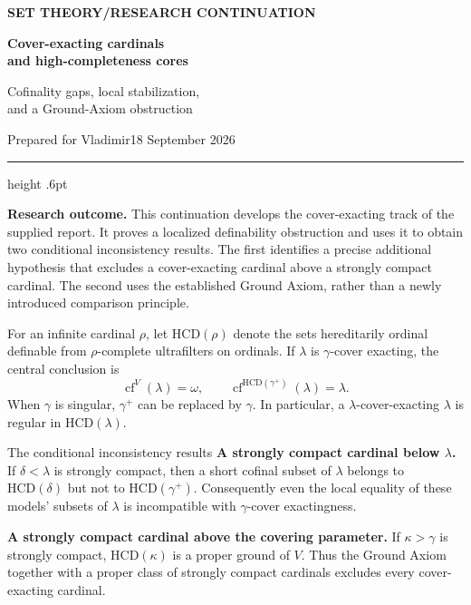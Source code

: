 \documentclass[11pt,letterpaper]{article}
\theoremstyle{definition}
\newcommand{\cf}{\operatorname{cf}}
\newcommand{\HCD}{\mathrm{HCD}}
\begin{document}
\thispagestyle{empty}
{\sffamily\bfseries\small\color{Olive}SET THEORY\quad /\quad RESEARCH CONTINUATION}

\vspace{13pt}
{\fontsize{28}{31}\selectfont\bfseries\color{Forest}Cover-exacting cardinals\\ and high-completeness cores\par}
\vspace{10pt}
{\fontsize{14}{18}\selectfont Cofinality gaps, local stabilization,\\ and a Ground-Axiom obstruction\par}
\vspace{14pt}
{\color{Muted}Prepared for Vladimir\hfill 18 September 2026\par}
\vspace{3pt}
{\color{Sage}\hrule height .6pt}
\vspace{12pt}

\textbf{Research outcome.} This continuation develops the cover-exacting track of the supplied report. It proves a localized definability obstruction and uses it to obtain two conditional inconsistency results. The first identifies a precise additional hypothesis that excludes a cover-exacting cardinal above a strongly compact cardinal. The second uses the established Ground Axiom, rather than a newly introduced comparison principle.

For an infinite cardinal $\rho$, let $\HCD(\rho)$ denote the sets hereditarily ordinal definable from $\rho$-complete ultrafilters on ordinals. If $\lambda$ is $\gamma$-cover exacting, the central conclusion is
\[
   \cf^V(\lambda)=\omega,
   \qquad
   \cf^{\HCD(\gamma^+)}(\lambda)=\lambda.
\]
When $\gamma$ is singular, $\gamma^+$ can be replaced by $\gamma$. In particular, a $\lambda$-cover-exacting $\lambda$ is regular in $\HCD(\lambda)$.

\begin{assessment}{The conditional inconsistency results}
\textbf{A strongly compact cardinal below $\lambda$.} If $\delta<\lambda$ is strongly compact, then a short cofinal subset of $\lambda$ belongs to $\HCD(\delta)$ but not to $\HCD(\gamma^+)$. Consequently even the local equality of these models' subsets of $\lambda$ is incompatible with $\gamma$-cover exactingness.

\textbf{A strongly compact cardinal above the covering parameter.} If $\kappa>\gamma$ is strongly compact, $\HCD(\kappa)$ is a proper ground of $V$. Thus the Ground Axiom together with a proper class of strongly compact cardinals excludes every cover-exacting cardinal.
\end{assessment}
\end{document}
